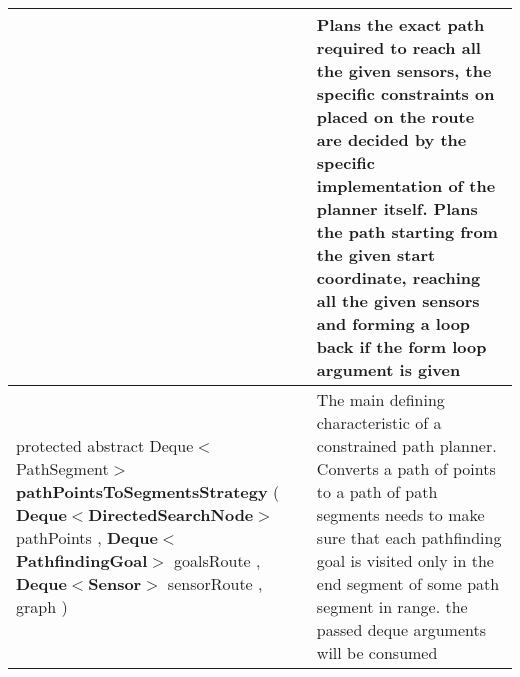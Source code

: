 {\begin{tabularx}{\linewidth}{X|m{}}
\begin{raggedleft}
\end{raggedleft} &
 Plans the exact path required to reach all the given sensors, the specific constraints on placed on the route are decided\newline%
 by the specific implementation of the planner itself.\newline%
 Plans the path starting from the given start coordinate, reaching all the given sensors and forming a loop back if the form loop argument is given\\ \hline 
\begin{raggedleft}protected abstract Deque$<$PathSegment$>$ \textbf{pathPointsToSegmentsStrategy }(\newline \hfill 
\hspace*{ 5pt} \textbf{Deque$<$DirectedSearchNode$>$} pathPoints , \newline
 \hspace*{ 5pt} \textbf{Deque$<$PathfindingGoal$>$} goalsRoute , \newline
 \hspace*{ 5pt} \textbf{Deque$<$Sensor$>$} sensorRoute , \newline
 \hspace*{ 5pt} \textbf{\hyperref[tab:ConstrainedTreeGraph]{\color{blue}{ConstrainedTreeGraph}}} graph  )
\end{raggedleft} &
 The main defining characteristic of a constrained path planner. Converts a path of points to a path of path segments\newline%
 needs to make sure that each pathfinding goal is visited only in the end segment of some path segment in range.\newline%
 the passed deque arguments will be consumed\\\end{tabularx}
}
